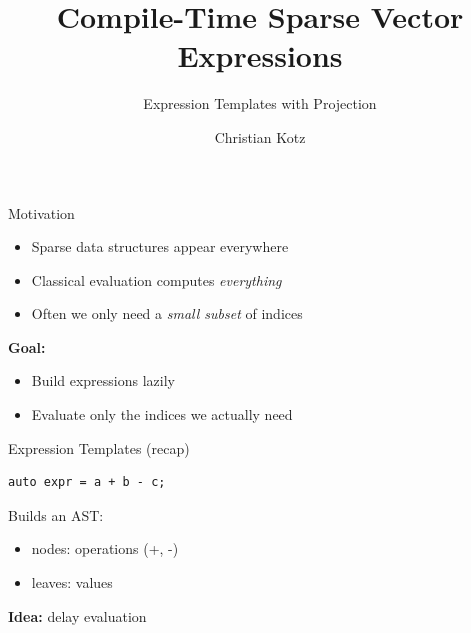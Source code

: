 \documentclass{beamer}
\title{Compile-Time Sparse Vector Expressions}
\subtitle{Expression Templates with Projection}
\author{Christian Kotz}
\date{}
\begin{document}
\frame{\titlepage}


\begin{frame}{Motivation}

\begin{itemize}
\item Sparse data structures appear everywhere
\item Classical evaluation computes \emph{everything}
\item Often we only need a \emph{small subset} of indices
\end{itemize}

\vspace{1em}

\textbf{Goal:}
\begin{itemize}
\item Build expressions lazily
\item Evaluate only the indices we actually need
\end{itemize}

\end{frame}


\begin{frame}[fragile]{Expression Templates (recap)}

\begin{lstlisting}
auto expr = a + b - c;
\end{lstlisting}

\vspace{1em}

Builds an AST:
\begin{itemize}
\item nodes: operations (+, -)
\item leaves: values
\end{itemize}

\vspace{1em}

\textbf{Idea:} delay evaluation

\end{frame}

\end{document}

